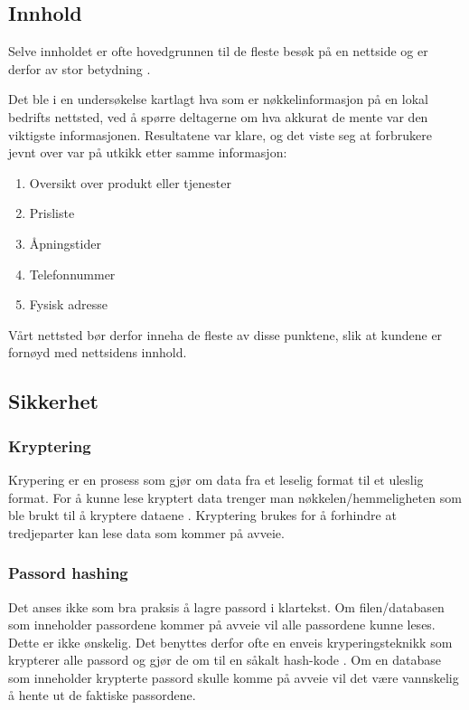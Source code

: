 \subsection{Innhold}
Selve innholdet er ofte hovedgrunnen til de fleste besøk på en nettside og er derfor av stor betydning \cite{thielsch2014ueo}.

Det ble i en undersøkelse \cite{marchant18wdc} kartlagt hva som er nøkkelinformasjon på en lokal bedrifts nettsted, ved å spørre deltagerne om hva akkurat de mente var den viktigste informasjonen. Resultatene var klare, og det viste seg at forbrukere jevnt over var på utkikk etter samme informasjon:
\begin{enumerate}
\item Oversikt over produkt eller tjenester
\item Prisliste
\item Åpningstider
\item Telefonnummer
\item Fysisk adresse
\end{enumerate}

Vårt nettsted bør derfor inneha de fleste av disse punktene, slik at kundene er fornøyd med nettsidens innhold.

\subsection{Sikkerhet}
\label{sec:analysis-security}
 
\subsubsection{Kryptering}
\label{sec:analysis-security-encryption}
Krypering er en prosess som gjør om data fra et leselig format til et uleslig format. For å kunne lese kryptert data trenger man nøkkelen/hemmeligheten som ble brukt til å kryptere dataene \cite[s.~117-118]{NattTomHeine2015Datasikkerhet}. Kryptering brukes for å forhindre at tredjeparter kan lese data som kommer på avveie.
 
\subsubsection{Passord hashing}
\label{sec:analysis-security-password-hashing}
Det anses ikke som bra praksis å lagre passord i klartekst. Om filen/databasen som inneholder passordene kommer på avveie vil alle passordene kunne leses. Dette er ikke ønskelig. Det benyttes derfor ofte en enveis kryperingsteknikk som krypterer alle passord og gjør de om til en såkalt hash-kode \cite[s.~100-103]{NattTomHeine2015Datasikkerhet}. Om en database som inneholder krypterte passord skulle komme på avveie vil det være vannskelig å hente ut de faktiske passordene.
 
